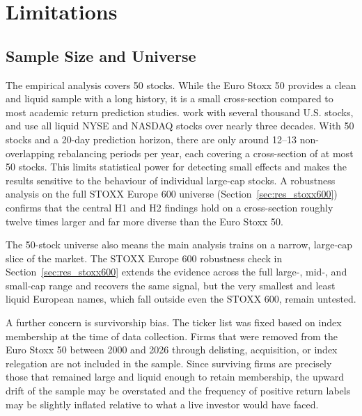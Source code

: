
\newpage
\section{Limitations}

\subsection{Sample Size and Universe}

The empirical analysis covers 50 stocks. While the Euro Stoxx 50 provides a clean and liquid sample with a long history, it is a small cross-section compared to most academic return prediction studies. \textcite{Gu2020} work with several thousand U.S. stocks, and \textcite{Jiang2023} use all liquid NYSE and NASDAQ stocks over nearly three decades. With 50 stocks and a 20-day prediction horizon, there are only around 12--13 non-overlapping rebalancing periods per year, each covering a cross-section of at most 50 stocks. This limits statistical power for detecting small effects and makes the results sensitive to the behaviour of individual large-cap stocks. A robustness analysis on the full STOXX Europe 600 universe (Section~\ref{sec:res_stoxx600}) confirms that the central H1 and H2 findings hold on a cross-section roughly twelve times larger and far more diverse than the Euro Stoxx 50.

The 50-stock universe also means the main analysis trains on a narrow, large-cap slice of the market. The STOXX Europe 600 robustness check in Section~\ref{sec:res_stoxx600} extends the evidence across the full large-, mid-, and small-cap range and recovers the same signal, but the very smallest and least liquid European names, which fall outside even the STOXX 600, remain untested.

A further concern is survivorship bias. The ticker list was fixed based on index membership at the time of data collection. Firms that were removed from the Euro Stoxx 50 between 2000 and 2026 through delisting, acquisition, or index relegation are not included in the sample. Since surviving firms are precisely those that remained large and liquid enough to retain membership, the upward drift of the sample may be overstated and the frequency of positive return labels may be slightly inflated relative to what a live investor would have faced.

